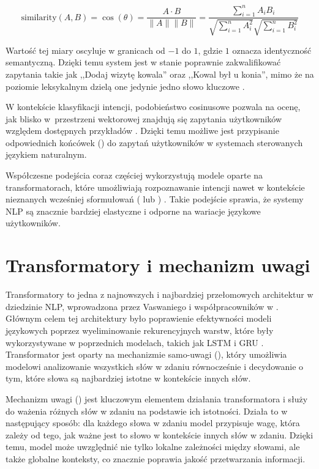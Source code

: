 	\begin{equation}
		\text{similarity}(A, B) = \cos(\theta) = \frac{A \cdot B}{\|A\| \|B\|} = \frac{\sum_{i=1}^{n} A_i B_i}{\sqrt{\sum_{i=1}^{n} A_i^2} \sqrt{\sum_{i=1}^{n} B_i^2}} 
		\label{eq:cosine}
	\end{equation}

	Wartość tej miary oscyluje w granicach od $-1$ do $1$, gdzie $1$ oznacza identyczność semantyczną. Dzięki temu system jest w stanie poprawnie zakwalifikować zapytania takie jak ,,Dodaj wizytę kowala'' oraz ,,Kowal był u konia'', mimo że na poziomie leksykalnym dzielą one jedynie jedno słowo kluczowe \cite{han2011}.

	W kontekście klasyfikacji intencji, podobieństwo cosinusowe pozwala na ocenę, jak blisko w~przestrzeni wektorowej znajdują się zapytania użytkowników względem dostępnych przykładów \cite{aggarwal2018textbook}. Dzięki temu możliwe jest przypisanie odpowiednich końcówek  () do zapytań użytkowników w systemach sterowanych językiem naturalnym.

	Współczesne podejścia coraz częściej wykorzystują modele oparte na transformatorach, które umożliwiają rozpoznawanie intencji nawet w kontekście nieznanych wcześniej sformułowań ( lub ) \cite{brown2020language}. Takie podejście sprawia, że systemy NLP są znacznie bardziej elastyczne i odporne na wariacje językowe użytkowników.
	
	\section{Transformatory i mechanizm uwagi}
	
	Transformatory to jedna z najnowszych i najbardziej przełomowych architektur w dziedzinie NLP, wprowadzona przez Vaswaniego i współpracowników w \cite{vaswani2017attention}. Głównym celem tej architektury było poprawienie efektywności modeli językowych poprzez wyeliminowanie rekurencyjnych warstw, które były wykorzystywane w poprzednich modelach, takich jak LSTM \cite{hochreiter1997lstm} i GRU \cite{cho2014gru}. Transformator jest oparty na mechanizmie samo-uwagi (), który umożliwia modelowi analizowanie wszystkich słów w zdaniu równocześnie i decydowanie o tym, które słowa są najbardziej istotne w kontekście innych słów.
	
	Mechanizm uwagi () jest kluczowym elementem działania transformatora i służy do ważenia różnych słów w zdaniu na podstawie ich istotności. Działa to w następujący sposób: dla każdego słowa w zdaniu model przypisuje wagę, która zależy od tego, jak ważne jest to słowo w kontekście innych słów w zdaniu. Dzięki temu, model może uwzględnić nie tylko lokalne zależności między słowami, ale także globalne konteksty, co znacznie poprawia jakość przetwarzania informacji.
	
